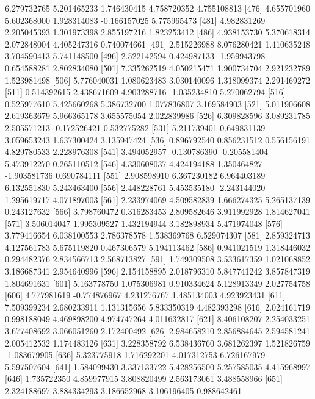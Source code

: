 \documentclass[12pt]{article}
\begin{document}
\begin{Schunk}
\begin{Soutput}
 [471]  6.279732765  5.201465233  1.746430415  4.758720352  4.755108813
 [476]  4.655701960  5.602368000  1.928314083 -0.166157025  5.775965473
 [481]  4.982831269  2.205045393  1.301973398  2.855197216  1.823253412
 [486]  4.938153730  5.370618314  2.072848004  4.405247316  0.740074661
 [491]  2.515226988  8.076280421  1.410635248  3.704590413  5.741148500
 [496]  2.522142594  0.424987133 -1.959943798  0.654588281  2.802834080
 [501]  7.335262519  4.050215471  1.900734704  2.921232789  1.523981498
 [506]  5.776040031  1.080623483  3.030140096  1.318099374  2.291469272
 [511]  0.514392615  2.438671609  4.903288716 -1.035234810  5.270062794
 [516]  0.525977610  5.425660268  5.386732700  1.077836807  3.169584903
 [521]  5.011906608  2.619363679  5.966365178  3.655575054  2.022839986
 [526]  6.309828596  3.089231785  2.505571213 -0.172526421  0.532775282
 [531]  5.211739401  0.649831139  3.059653243  1.637300424  3.135947424
 [536]  0.896792540  0.856231512  0.556156191  4.829780533  2.228976308
 [541]  3.494052957 -0.130786390 -0.205581404  5.473912270  0.265110512
 [546]  4.330608037  4.424194188  1.350464827 -1.903581736  0.690784111
 [551]  2.908598910  6.367230182  6.964403189  6.132551830  5.243463400
 [556]  2.448228761  5.453535180 -2.243144020  1.295619717  4.071897003
 [561]  2.233974069  4.509582839  1.666274325  5.265137139  0.243127632
 [566]  3.798760472  0.316283453  2.809582646  3.911992928  1.814627041
 [571]  3.506014047  1.995309527  1.432194944  3.182898934  5.471974048
 [576]  3.779416654  6.038100553  2.786378578  1.538369768  6.529074307
 [581]  2.859324713  4.127561783  5.675119820  0.467306579  5.194113462
 [586]  0.941021519  1.318446032  0.294482376  2.834566713  2.568713827
 [591]  1.749309508  3.533617359  1.021068852  3.186687341  2.954640996
 [596]  2.154158895  2.018796310  5.847741242  3.857847319  1.804691631
 [601]  5.163778750  1.075306981  0.910334624  5.128913349  2.027754758
 [606]  4.777981619 -0.774876967  4.231276767  1.485134003  4.923923431
 [611]  7.509399234  2.680233911  1.131315656  5.833350319  4.482393298
 [616]  2.024161719  0.998188049  4.469898200  4.974747264  4.011632817
 [621]  8.406108207  2.254033251  3.677408692  3.066051260  2.172400492
 [626]  2.984658210  2.856884645  2.594581241  2.005412532  1.174483126
 [631]  3.228358792  6.538436760  3.681262397  1.521826759 -1.083679905
 [636]  5.323775918  1.716292201  4.017312753  6.726167979  5.597507604
 [641]  1.584099430  3.337133722  5.428256500  5.257585035  4.415968997
 [646]  1.735722350  4.859977915  3.808820499  2.563173061  3.488558966
 [651]  2.324188697  3.884334293  3.186652968  3.106196405  0.988642461

\end{Soutput}
\end{Schunk}
\end{document}
